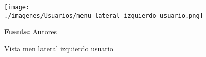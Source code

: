 \begin{figure}[!htb]
  \begin{center}
\texttt{[image: ./imagenes/Usuarios/menu\_lateral\_izquierdo\_usuario.png]}
    \caption{Vista men lateral izquierdo usuario}
    \label{fig:Vista_menu_lateral_izquierdo_usuario}
    \textbf{Fuente:}  Autores
  \end{center}
\end{figure}
